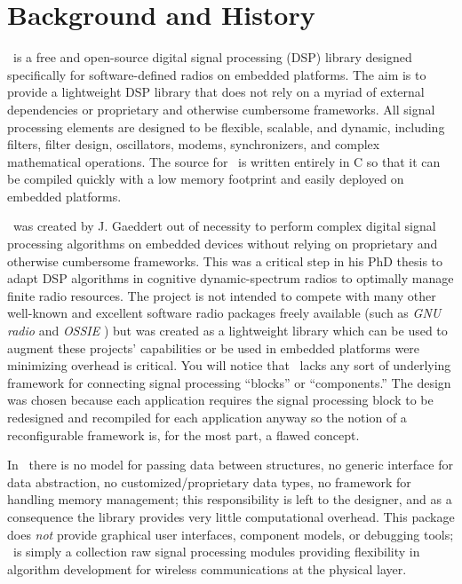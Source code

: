 %
%

\newpage
\section{Background and History}

\liquid\ is a free and open-source digital signal processing (DSP) library
designed specifically for software-defined radios on embedded platforms.
The aim is to provide a lightweight DSP library that does not rely on a myriad
of external dependencies or proprietary and otherwise cumbersome frameworks.
%
All signal processing elements are designed to be flexible, scalable, and
dynamic, including filters, filter design, oscillators, modems, synchronizers,
and complex mathematical operations.
The source for \liquid\ is written entirely in C so that it can be
compiled quickly with a low memory footprint
and easily deployed on embedded platforms.

\liquid\ was created by J. Gaeddert out of necessity to perform complex
digital signal processing algorithms on embedded devices
without relying on %
proprietary and otherwise cumbersome frameworks.
This was a critical step in his PhD thesis to adapt DSP algorithms in
cognitive dynamic-spectrum radios to optimally manage finite radio resources.
The project is not intended to compete with many other well-known and
excellent software radio packages freely available
(such as {\em GNU radio} \cite{gnuradio:web} and {\em OSSIE}
\cite{ossie:web})
but was created as a lightweight library which can be used to augment
these projects' capabilities
or be used in embedded platforms were minimizing overhead is critical.
You will notice that \liquid\ lacks any sort of underlying framework
for connecting signal processing ``blocks'' or ``components.''
The design was chosen because each application requires the signal
processing block to be redesigned and recompiled for each application
anyway so the notion of a reconfigurable framework is, for the most
part, a flawed concept.

In \liquid\ there is
no model for passing data between structures,
no generic interface for data abstraction,
no customized/proprietary data types,
no framework for handling memory management;
this responsibility is left to the designer,
and as a consequence the library provides very little computational overhead.
This package does {\em not} provide
graphical user interfaces,
component models, or
debugging tools;
\liquid\ is simply a collection raw signal processing modules
providing flexibility in algorithm development for wireless
communications at the physical layer.


